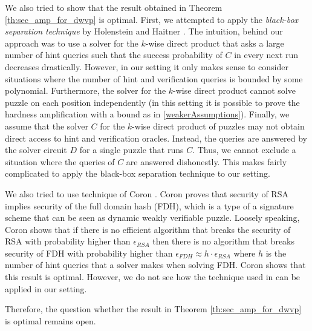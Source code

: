 We also tried to show that the result obtained in Theorem \ref{th:sec_amp_for_dwvp} is optimal.
First, we attempted to apply the \textit{black-box separation technique} by Holenstein and Haitner \cite{haitner2009possibility}.
The intuition, behind our approach was to use a solver for the $k$-wise direct product that asks a large number of hint queries such that
the success probability of $C$ in every next run decreases drastically.
However, in our setting it only makes sense to consider situations where the number of hint and verification queries is bounded by some polynomial.
Furthermore, the solver for the $k$-wise direct product cannot solve puzzle on each position independently (in this setting it is possible
to prove the hardness amplification with a bound as in \ref{weakerAssumptions}).
Finally, we assume that the solver $C$ for the $k$-wise direct product of puzzles may not obtain direct access to hint and verification oracles.
Instead, the queries are answered by the solver circuit $D$ for a single puzzle that runs $C$. Thus, we cannot exclude a situation where the queries of $C$
are answered dishonestly.
This makes fairly complicated to apply the black-box separation technique to our setting.

We also tried to use technique of Coron \cite{coron2000exact, coron2002optimal}.
Coron \cite{coron2000exact, coron2002optimal} proves that security of RSA implies security of the full domain hash (FDH),
which is a type of a signature scheme that can be seen as dynamic weakly verifiable puzzle.
Loosely speaking, Coron shows that if there is no efficient algorithm that breaks the security of RSA with probability higher
than $\epsilon_{\mathit{RSA}}$ then there is no algorithm that breaks security of FDH with probability higher than
$\epsilon_{\mathit{FDH}} \approx h \cdot \epsilon_{\mathit{RSA}}$ where $h$ is the number of hint queries that a solver makes when solving FDH.
Coron shows that this result is optimal. However, we do not see how the technique used in \cite{coron2002optimal} can be applied in our setting.

Therefore, the question whether the result in Theorem \ref{th:sec_amp_for_dwvp} is optimal remains open.

